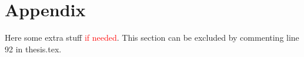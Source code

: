 \chapter{Appendix}

Here some extra stuff \textcolor{red}{if needed}. This section can be excluded by commenting line 92 in thesis.tex.